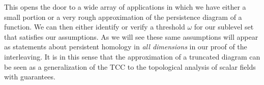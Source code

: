 This opens the door to a wide array of applications in which we have either a small portion or a very rough approximation of the persistence diagram of a function.
We can then either identify or verify a threshold $\omega$ for our sublevel set that satisfies our assumptions.
As we will see these same assumptions will appear as statements about persistent homology in \emph{all dimensions} in our proof of the interleaving.
It is in this sense that the approximation of a truncated diagram can be seen as a generalization of the TCC to the topological analysis of scalar fields with guarantees.
%
